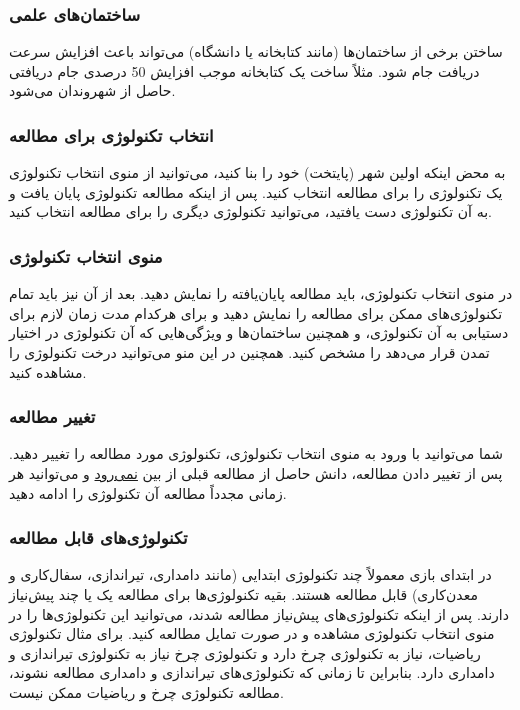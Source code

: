 \documentclass[]{article}
\begin{document}
\subsubsection*{{\titr ساختمان‌های علمی}}
ساختن برخی از ساختمان‌ها (مانند کتابخانه یا دانشگاه) می‌تواند باعث افزایش سرعت دریافت جام شود. مثلاً ساخت یک کتابخانه موجب افزایش 50 درصدی جام دریافتی حاصل از شهروندان می‌شود.

\subsubsection*{{\titr انتخاب تکنولوژی برای مطالعه}}
به محض اینکه اولین شهر (پایتخت) خود را بنا کنید، می‌توانید از منوی انتخاب تکنولوژی یک تکنولوژی را برای مطالعه انتخاب کنید. پس از اینکه مطالعه تکنولوژی پایان یافت و به آن تکنولوژی دست یافتید، می‌توانید تکنولوژی دیگری را برای مطالعه انتخاب کنید.

\subsubsection*{{\titr منوی انتخاب تکنولوژی}}
در منوی انتخاب تکنولوژی، باید مطالعه پایان‌یافته را نمایش دهید. بعد از آن نیز باید تمام تکنولوژی‌های ممکن برای مطالعه را نمایش دهید و برای هرکدام مدت زمان لازم برای دستیابی به آن تکنولوژی، و همچنین ساختمان‌ها و ویژگی‌هایی که آن تکنولوژی در اختیار تمدن قرار می‌دهد را مشخص کنید. همچنین در این منو می‌توانید درخت تکنولوژی را مشاهده کنید.

\subsubsection*{{\titr تغییر مطالعه}}
شما می‌توانید با ورود به منوی انتخاب تکنولوژی، تکنولوژی مورد مطالعه را تغییر دهید. پس از تغییر دادن مطالعه، دانش حاصل از مطالعه قبلی از بین \underline{نمی‌رود} و می‌توانید هر زمانی مجدداً مطالعه آن تکنولوژی را ادامه دهید.

\subsubsection*{{\titr تکنولوژی‌های قابل مطالعه}}
در ابتدای بازی معمولاً چند تکنولوژی ابتدایی (مانند دامداری، تیراندازی، سفال‌کاری و معدن‌کاری) قابل مطالعه هستند. بقیه تکنولوژی‌ها برای مطالعه یک یا چند پیش‌نیاز دارند. پس از اینکه تکنولوژی‌های پیش‌نیاز مطالعه شدند، می‌توانید این تکنولوژی‌ها را در منوی انتخاب تکنولوژی مشاهده و در صورت تمایل مطالعه کنید. برای مثال تکنولوژی ریاضیات، نیاز به تکنولوژی چرخ دارد و تکنولوژی چرخ نیاز به تکنولوژی تیراندازی و دامداری دارد. بنابراین تا زمانی که تکنولوژی‌های تیراندازی و دامداری مطالعه نشوند، مطالعه تکنولوژی چرخ و ریاضیات ممکن نیست.
\end{document}
